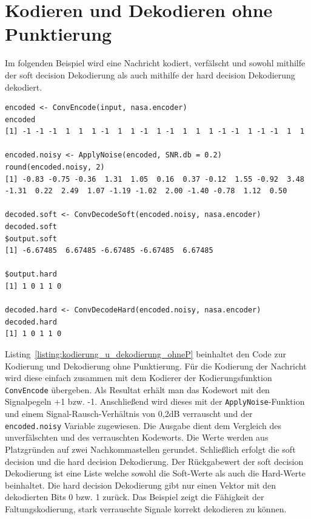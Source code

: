 \section{Kodieren und Dekodieren ohne Punktierung}
\label{kapitel:beispiele_kodieren_ohneP}
Im folgenden Beispiel wird eine Nachricht kodiert, verfälscht und sowohl mithilfe der soft decision Dekodierung als auch mithilfe der hard decision Dekodierung dekodiert.
\begin{lstlisting}[caption=Kodierung und Dekodierung ohne Punktierung, label={listing:kodierung_u_dekodierung_ohneP}, float=!tbh]
encoded <- ConvEncode(input, nasa.encoder)
encoded
[1] -1 -1 -1  1  1  1 -1  1  1 -1  1 -1  1  1  1 -1 -1  1 -1 -1  1  1
 
encoded.noisy <- ApplyNoise(encoded, SNR.db = 0.2)
round(encoded.noisy, 2)
[1] -0.83 -0.75 -0.36  1.31  1.05  0.16  0.37 -0.12  1.55 -0.92  3.48 -1.31  0.22  2.49  1.07 -1.19 -1.02  2.00 -1.40 -0.78  1.12  0.50

decoded.soft <- ConvDecodeSoft(encoded.noisy, nasa.encoder)
decoded.soft
$output.soft
[1] -6.67485  6.67485 -6.67485 -6.67485  6.67485

$output.hard
[1] 1 0 1 1 0

decoded.hard <- ConvDecodeHard(encoded.noisy, nasa.encoder)
decoded.hard
[1] 1 0 1 1 0
\end{lstlisting}
Listing~\ref{listing:kodierung_u_dekodierung_ohneP} beinhaltet den Code zur Kodierung und Dekodierung ohne Punktierung. Für die Kodierung der Nachricht wird diese einfach zusammen mit dem Kodierer der Kodierungsfunktion \texttt{ConvEncode} übergeben. Als Resultat erhält man das Kodewort mit den Signalpegeln +1 bzw. -1. Anschließend wird dieses mit der \texttt{ApplyNoise}-Funktion und einem Signal-Rausch-Verhältnis von 0,2dB verrauscht und der \texttt{encoded.noisy} Variable zugewiesen. Die Ausgabe dient dem Vergleich des unverfälschten und des verrauschten Kodeworts. Die Werte werden aus Platzgründen auf zwei Nachkommastellen gerundet. Schließlich erfolgt die soft decision und die hard decision Dekodierung. Der Rückgabewert der soft decision Dekodierung ist eine Liste welche sowohl die Soft-Werte als auch die Hard-Werte beinhaltet. Die hard decision Dekodierung gibt nur einen Vektor mit den dekodierten Bits 0 bzw. 1 zurück. Das Beispiel zeigt die Fähigkeit der Faltungskodierung, stark verrauschte Signale korrekt dekodieren zu können.

